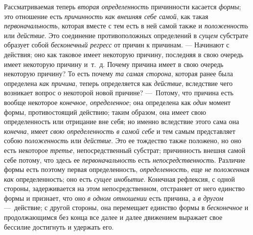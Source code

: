 Рассматриваемая теперь {\em вторая определенность}
причинности касается {\em формы}; это отношение есть
{\em причинность как внешняя себе самой}, как такая
{\em первоначальность}, которая вместе с тем есть в ней
самой также и {\em положенность} или
{\em действие}. Это соединение противоположных
определений в {\em сущем} субстрате образует собой
{\em бесконечный регресс} от причин к причинам. —
Начинают с действия; оно как таковое имеет некоторую причину, последняя в
свою очередь имеет некоторую причину и~т.~д. Почему причина имеет в свою
очередь некоторую причину? То есть почему {\em та самая
сторона}, которая ранее была определена {\em как
причина}, теперь определяется как {\em действие},
вследствие чего возникает вопрос о некоторой новой причине? —~Потому, что
причина есть вообще некоторое {\em конечное,
определенное}; она определена как {\em один} момент
формы, противостоящий действию; таким образом, она имеет свою
определенность или отрицание вне себя; но именно вследствие этого сама она
{\em конечна}, имеет {\em свою
определенность в самой себе} и тем самым представляет собою
{\em положенность} или
{\em действие}. Это ее тождество также положено, но оно
есть некоторое {\em третье}, непосредственный субстрат;
причинность внешня самой себе потому, что здесь ее
{\em первоначальность} есть
{\em непосредственность}. Различие формы есть поэтому
первая определенность, {\em определенность}, еще
{\em не положенная как} определенность; оно есть
{\em сущее инобытие}. Конечная рефлексия, с одной
стороны, задерживается на этом непосредственном, отстраняет от него
единство формы и признает, что оно {\em в одном
отношении} есть причина, а {\em в другом} —~действие; с
другой стороны, она перемещает единство формы в
{\em бесконечное} и продолжающимся без конца все далее
и далее движением выражает свое бессилие достигнуть и удержать его.

